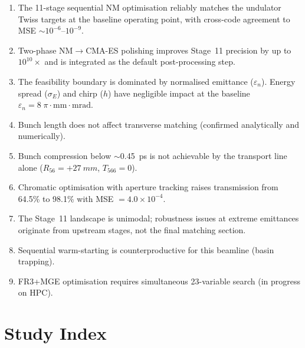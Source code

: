 \documentclass[11pt]{article}
\begin{document}
\begin{enumerate}[nosep]
  \item The 11-stage sequential NM optimisation reliably matches the
    undulator Twiss targets at the baseline operating point, with
    cross-code agreement to MSE $\sim 10^{-6}$--$10^{-9}$.
  \item Two-phase NM$\to$CMA-ES polishing improves Stage~11 precision by
    up to $10^{10}\times$ and is integrated as the default post-processing
    step.
  \item The feasibility boundary is dominated by normalised emittance
    ($\varepsilon_n$).  Energy spread ($\sigma_E$) and chirp ($h$) have
    negligible impact at the baseline $\varepsilon_n = 8\;
    \pi\cdot\text{mm}\cdot\text{mrad}$.
  \item Bunch length does not affect transverse matching (confirmed
    analytically and numerically).
  \item Bunch compression below $\sim$\SI{0.45}{ps} is not achievable
    by the transport line alone ($R_{56} = +\SI{27}{mm}$, $T_{566} = 0$).
  \item Chromatic optimisation with aperture tracking raises transmission
    from 64.5\% to 98.1\% with MSE $= 4.0 \times 10^{-4}$.
  \item The Stage~11 landscape is unimodal; robustness issues at extreme
    emittances originate from upstream stages, not the final matching
    section.
  \item Sequential warm-starting is counterproductive for this beamline
    (basin trapping).
  \item FR3+MGE optimisation requires simultaneous 23-variable search
    (in progress on HPC).
\end{enumerate}


\section{Study Index}
\label{sec:index}
\end{document}
